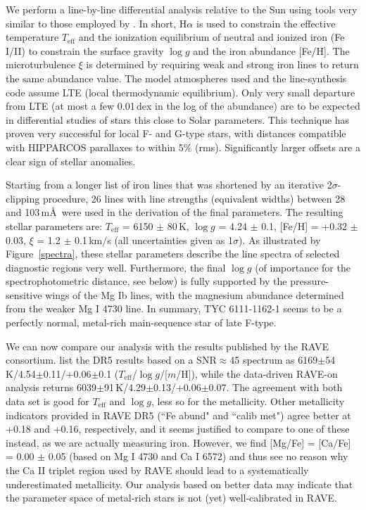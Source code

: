 \documentclass[twocolumn]{aastex6}
\begin{document}
We perform a line-by-line differential analysis relative to the Sun using tools very similar to those employed by \cite{Fuhrmann04}. In short, H$\alpha$ is used to constrain the effective temperature $T_\mathrm{eff}$ and the ionization equilibrium of neutral and ionized iron (Fe I/II) to constrain the surface gravity $\log g$ and the iron abundance [Fe/H]. The microturbulence $\xi$ is determined by requiring weak and strong iron lines to return the same abundance value. The model atmospheres used and the line-synthesis code assume LTE (local thermodynamic equilibrium). Only very small departure from LTE (at most a few 0.01\,dex in the log of the abundance) are to be expected in differential studies of stars this close to Solar parameters. This technique has proven very successful for local F- and G-type stars, with distances compatible with HIPPARCOS parallaxes to within 5\% (rms). Significantly larger offsets are a clear sign of stellar anomalies.

Starting from a longer list of iron lines that was shortened by an iterative 2$\sigma$-clipping procedure, 26 lines with line strengths (equivalent widths) between 28 and 103\,m\AA\ were used in the derivation of the final parameters. The resulting stellar parameters are: $T_\mathrm{eff}$ = 6150 $\pm$ 80\,K, $\log g$ = 4.24 $\pm$ 0.1, [Fe/H] = +0.32 $\pm$ 0.03, $\xi$ = 1.2 $\pm$ 0.1\,km/s (all uncertainties given as 1$\sigma$). As illustrated by Figure~\ref{spectra}, these stellar parameters describe the line spectra of selected diagnostic regions very well. Furthermore, the final $\log g$ (of importance for the spectrophotometric distance, see below) is fully supported by the pressure-sensitive wings of the Mg Ib lines, with the magnesium abundance determined from the weaker Mg I 4730 line. In summary, TYC 6111-1162-1 seems to be a perfectly normal, metal-rich main-sequence star of late F-type.

We can now compare our analysis with the results published by the RAVE consortium. \cite{Kunder17} list the DR5 results based on a SNR$\approx$45 spectrum as 6169$\pm$54\,K/4.54$\pm$0.11/+0.06$\pm$0.1 ($T_\mathrm{eff}$/$\log g$/[$m$/H]), while the data-driven RAVE-on analysis returns 6039$\pm$91\,K/4.29$\pm$0.13/+0.06$\pm$0.07. The agreement with both data set is good for $T_\mathrm{eff}$ and $\log g$, less so for the metallicity. Other metallicity indicators provided in RAVE DR5 (``Fe abund" and ``calib met") agree better at +0.18 and +0.16, respectively, and it seems justified to compare to one of these instead, as we are actually measuring iron. However, we find [Mg/Fe] = [Ca/Fe] = 0.00 $\pm$ 0.05 (based on Mg I 4730 and Ca I 6572) and thus see no reason why the Ca II triplet region used by RAVE should lead to a systematically underestimated metallicity. Our analysis based on better data may indicate that the parameter space of metal-rich stars is not (yet) well-calibrated in RAVE.
\end{document}
